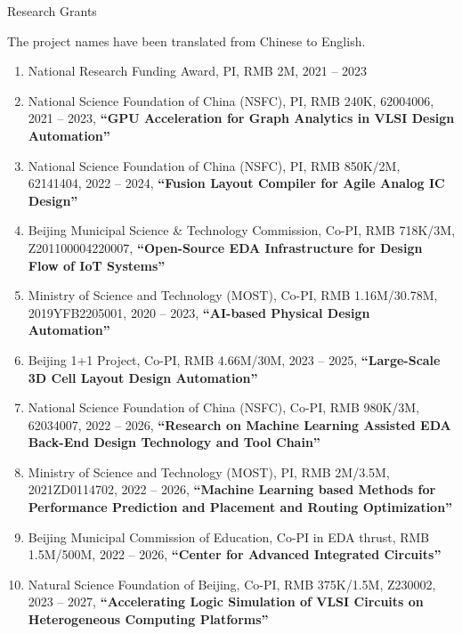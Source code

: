 \begin{rSection}{Research Grants}

  The project names have been translated from Chinese to English. 

\begin{enumerate}[font=\normalfont]

\item National Research Funding Award, PI, RMB 2M, 2021 -- 2023

\item National Science Foundation of China (NSFC), PI, RMB 240K, 62004006, 2021 -- 2023, \textbf{``GPU Acceleration for Graph Analytics in VLSI Design Automation''}

\item National Science Foundation of China (NSFC), PI, RMB 850K/2M, 62141404, 2022 -- 2024, \textbf{``Fusion Layout Compiler for Agile Analog IC Design''}

\item Beijing Municipal Science \& Technology Commission, Co-PI, RMB 718K/3M, Z201100004220007, \textbf{``Open-Source EDA Infrastructure for Design Flow of IoT Systems''}

\item Ministry of Science and Technology (MOST), Co-PI, RMB 1.16M/30.78M, 2019YFB2205001, 2020 -- 2023, \textbf{``AI-based Physical Design Automation''}

\item Beijing 1+1 Project, Co-PI, RMB 4.66M/30M, 2023 -- 2025, \textbf{``Large-Scale 3D Cell Layout Design Automation''}

\item National Science Foundation of China (NSFC), Co-PI, RMB 980K/3M, 62034007, 2022 -- 2026, \textbf{``Research on Machine Learning Assisted EDA Back-End Design Technology and Tool Chain''}

\item Ministry of Science and Technology (MOST), PI, RMB 2M/3.5M, 2021ZD0114702, 2022 -- 2026, \textbf{``Machine Learning based Methods for Performance Prediction and Placement and Routing Optimization''}

\item Beijing Municipal Commission of Education, Co-PI in EDA thrust, RMB 1.5M/500M, 2022 -- 2026, \textbf{``Center for Advanced Integrated Circuits''}

\item Natural Science Foundation of Beijing, Co-PI, RMB 375K/1.5M, Z230002, 2023 -- 2027, \textbf{``Accelerating Logic Simulation of VLSI Circuits on Heterogeneous Computing Platforms''}


\end{enumerate}
\end{rSection}
